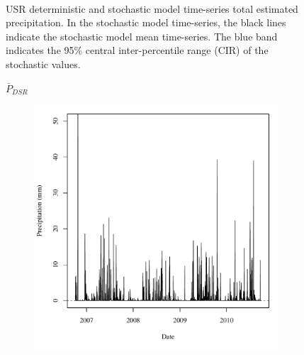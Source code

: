 \begin{landscape}
\begin{figure}
\begin{subfigure}{0.7\textwidth}
		\end{subfigure}\\
		\caption[USR deterministic and stochastic model time-series total estimated precipitation.]{USR deterministic and stochastic model time-series total estimated precipitation.  In the stochastic model time-series, the black lines indicate the stochastic model mean time-series.  The blue band indicates the 95\% central inter-percentile range (CIR) of the stochastic values.}
		\label{fig:reachPrecip_US}
	\end{figure}
\end{landscape}
\subfiguretop
\begin{landscape}
	\begin{figure}
		\centering
		$ \displaystyle \overline{P}_{DSR} $
		\begin{subfigure}{0.7\textwidth}
			\centering
			\includegraphics[width=\tableCustomSize]{"Figures/Results_DSR/Deterministic/A Precip"}
		\end{subfigure}%
		\begin{subfigure}{0.7\textwidth}
			\centering

\end{subfigure}
\end{figure}
\end{landscape}
